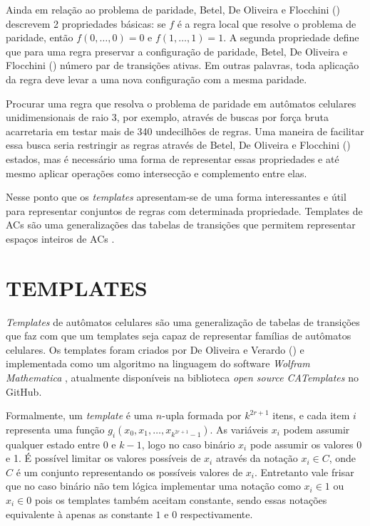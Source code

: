 \documentclass[12pt,a4paper]{article}
\let\stdsection\section
\renewcommand\section{\newpage\stdsection}
\begin{document}
Ainda em relação ao problema de paridade, Betel, De Oliveira e Flocchini (\citeyear{Betel2013}) descrevem 2 propriedades básicas: se $f$ é a regra local que resolve o problema de paridade, então $f(0, \dots, 0) = 0$ e $f(1, \dots, 1) = 1$. A segunda propriedade define que para uma regra preservar a configuração de paridade, Betel, De Oliveira e Flocchini (\citeyear{Betel2013}) número par de transições ativas. Em outras palavras, toda aplicação da regra deve levar a uma nova configuração com a mesma paridade.

Procurar uma regra que resolva o problema de paridade em autômatos celulares unidimensionais de raio 3, por exemplo, através de buscas por força bruta acarretaria em testar mais de 340 undecilhões de regras. Uma maneira de facilitar essa busca seria restringir as regras através de Betel, De Oliveira e Flocchini (\citeyear{Betel2013}) estados, mas é necessário uma forma de representar essas propriedades e até mesmo aplicar operações como intersecção e complemento entre elas.

Nesse ponto que os \textit{templates} apresentam-se de uma forma interessantes e útil para representar conjuntos de regras com determinada propriedade. Templates de ACs são uma generalizações das tabelas de transições que permitem representar espaços inteiros de ACs \cite{Verardo2014}.








\section{TEMPLATES}\label{sec:templates}
\textit{Templates} de autômatos celulares são uma generalização de tabelas de transições que faz com que um templates seja capaz de representar famílias de autômatos celulares. Os templates foram criados por De Oliveira e Verardo (\citeyear{deOliveira2014}) e implementada como um algoritmo na linguagem do software \textit{Wolfram Mathematica} \cite{woframMathematica10}, atualmente disponíveis na biblioteca \textit{open source CATemplates} \cite{CATemplates} no GitHub.

Formalmente, um \textit{template} é uma $n$-upla formada por $k^{2r+1}$ itens, e cada item $i$ representa uma função $g_i(x_0,x_1,\dots,x_{k^{2r+1}-1})$. As variáveis $x_i$ podem assumir qualquer estado entre 0 e $k-1$, logo no caso binário $x_i$ pode assumir os valores 0 e 1. É possível limitar os valores possíveis de $x_i$ através da notação $x_i \in C$, onde $C$ é um conjunto representando os possíveis valores de $x_i$. Entretanto vale frisar que no caso binário não tem lógica implementar uma notação como $x_i \in {1}$ ou $x_i \in {0}$ pois os templates também aceitam constante, sendo essas notações equivalente à apenas as constante $1$ e $0$ respectivamente.
\end{document}
